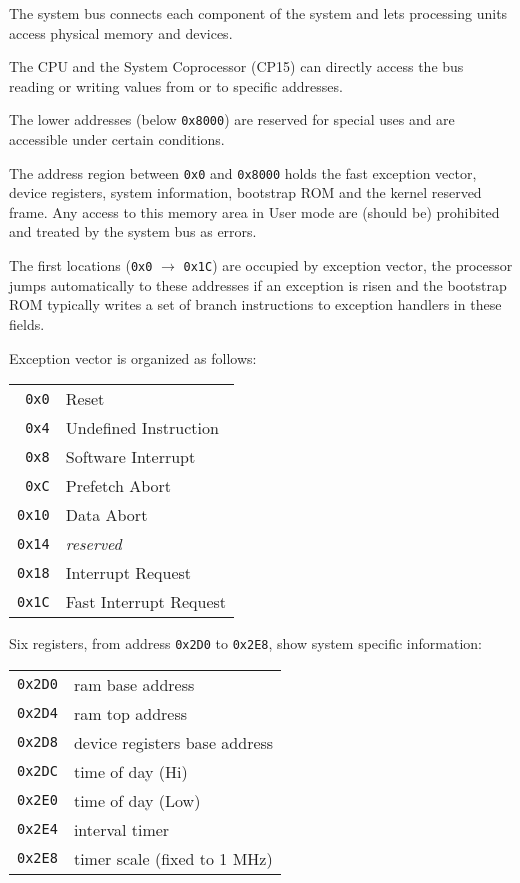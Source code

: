 
The system bus connects each component of the system and lets processing units access physical memory and devices.

The CPU and the System Coprocessor (CP15) can directly access the bus reading or writing values from or to specific addresses.

The lower addresses (below \texttt{0x8000}) are reserved for special uses and are accessible under certain conditions.

The address region between \texttt{0x0} and \texttt{0x8000} holds the fast exception vector, device registers, system information, bootstrap ROM and the kernel reserved frame. Any access to this memory area in User mode are (should be) prohibited and treated by the system bus as errors.

\label{sec:man:exceptionVector}
The first locations (\texttt{0x0} $\rightarrow$ \texttt{0x1C}) are occupied by exception vector, the processor jumps automatically to these addresses if an exception is risen and the bootstrap ROM typically writes a set of branch instructions to exception handlers in these fields.

Exception vector is organized as follows:
\\

\begin{tabular}{r|l}
\texttt{0x0} & Reset \\
\texttt{0x4} & Undefined Instruction \\
\texttt{0x8} & Software Interrupt \\
\texttt{0xC} & Prefetch Abort \\
\texttt{0x10} & Data Abort \\
\texttt{0x14} & \emph{reserved} \\
\texttt{0x18} & Interrupt Request \\
\texttt{0x1C} & Fast Interrupt Request \\
\end{tabular}


Six registers, from address \texttt{0x2D0} to \texttt{0x2E8}, show system specific information:
\\

\begin{tabular}{r|l}
\texttt{0x2D0} & ram base address \\
\texttt{0x2D4} & ram top address \\
\texttt{0x2D8} & device registers base address \\
\texttt{0x2DC} & time of day (Hi) \\
\texttt{0x2E0} & time of day (Low) \\
\texttt{0x2E4} & interval timer \\
\texttt{0x2E8} & timer scale (fixed to 1 MHz) \\
\end{tabular}

